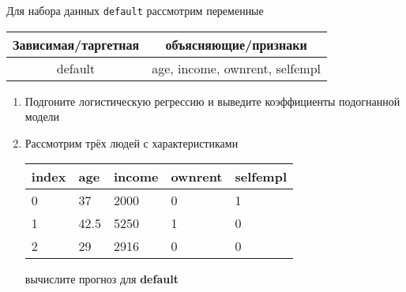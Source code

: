 \begin{exercise}
Для набора данных \texttt{default} рассмотрим переменные

\begin{center}
	\begin{tabular}{|c|c|} \hline
		Зависимая/таргетная & объясняющие/признаки \\ \hline
		default & age, income, ownrent, selfempl \\ \hline
	\end{tabular}
\end{center}

\begin{enumerate}
	\item Подгоните логистическую регрессию и выведите коэффициенты подогнанной модели
	\item Рассмотрим трёх людей с характеристиками
	\begin{center}
		\begin{tabular}{|l||l|l|l|l|}\hline
			index & age & income & ownrent & selfempl  \\ \hline\hline
			0 & 37 & 2000 & 0 & 1  \\
			1 & 42.5 & 5250 & 1 & 0  \\
			2 & 29 & 2916 & 0 & 0  \\ \hline
		\end{tabular}
	\end{center}
	вычислите прогноз для \textbf{default} 
\end{enumerate}
\end{exercise}

